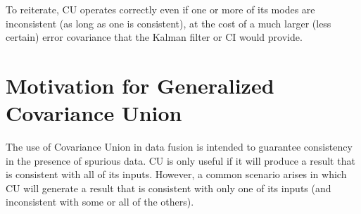 To reiterate, CU operates correctly even if one or more of its modes are inconsistent (as long as one is consistent), at
the cost of a much larger (less certain) error covariance that the Kalman filter or CI would provide.


\section{Motivation for Generalized Covariance Union}\label{section:motivation}

The use of Covariance Union in data fusion is intended to guarantee consistency in the presence of spurious
data. CU is only useful if it will produce a result that is consistent with all of its inputs. However, a common
scenario arises in which CU will generate a result that is consistent with only one of its inputs (and inconsistent with
some or all of the others).


